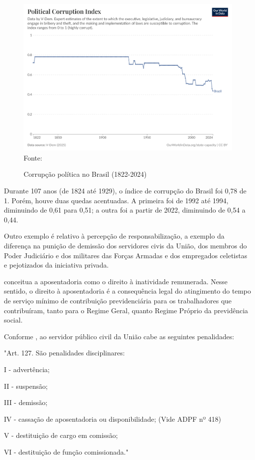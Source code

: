 \begin{figure}[H]
	\centering
	\caption{Corrupção política no Brasil (1822-2024)}
	\includegraphics[width=1\linewidth]{figuras/political-corruption-index-brasil}
	\label{fig:political-corruption-index-brasil}
	\footnotesize{Fonte: \cite{political-corruption-index}}
\end{figure} 

Durante 107 anos (de 1824 até 1929), o índice de corrupção do Brasil foi 0,78 de 1. Porém, houve duas quedas acentuadas. A primeira foi de 1992 até 1994, diminuindo de 0,61 para 0,51; a outra foi a partir de 2022, diminuindo de 0,54 a 0,44.

Outro exemplo é relativo à percepção de responsabilização, a exemplo da diferença na punição de demissão dos servidores civis da União, dos membros do Poder Judiciário e dos militares das Forças Armadas e dos empregados celetistas e pejotizados da iniciativa privada.

\cite{bramante2000desaposentaccao} conceitua a aposentadoria como o direito à inatividade remunerada. Nesse sentido, o direito à aposentadoria é a consequência legal do atingimento do tempo de serviço mínimo de contribuição previdenciária para os trabalhadores que contribuíram, tanto para o Regime Geral, quanto Regime Próprio da previdência social. 

Conforme \cite{l8112}, ao servidor público civil da União cabe as seguintes penalidades:

\noindent
\begin{flushleft}
	\setlength{\leftskip}{4cm}
	\small
	"Art. 127.  São penalidades disciplinares:
	
	I - advertência;
	
	II - suspensão;
	
	III - demissão;
	
	IV - cassação de aposentadoria ou disponibilidade; (Vide ADPF nº 418)
	
	V - destituição de cargo em comissão;
	
	VI - destituição de função comissionada." \cite{l8112}
\end{flushleft}

